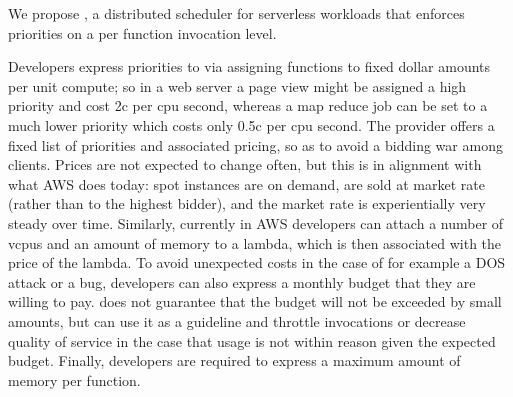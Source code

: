 We propose \sys{}, a distributed scheduler for serverless workloads that enforces
priorities on a per function invocation level.


Developers express priorities to \sys{} via assigning functions to fixed dollar
amounts per unit compute; so in a web server a page view might be assigned a
high priority and cost 2c per cpu second, whereas a map reduce job can be set to
a much lower priority which costs only 0.5c per cpu second. The provider offers
a fixed list of priorities and associated pricing, so as to avoid a bidding war
among clients. Prices are not expected to change often, but this is in alignment
with what AWS does today: spot instances are on demand, are sold at market rate
(rather than to the highest bidder), and the market rate is experientially very
steady over time. Similarly, currently in AWS developers can attach a number of
vcpus and an amount of memory to a lambda, which is then associated with the
price of the lambda. To avoid unexpected costs in the case of for example a DOS
attack or a bug, developers can also express a monthly budget that they are
willing to pay. \sys{} does not guarantee that the budget will not be exceeded by
small amounts, but can use it as a guideline and throttle invocations or
decrease quality of service in the case that usage is not within reason given
the expected budget. Finally, developers are required to express a maximum
amount of memory per function. 

